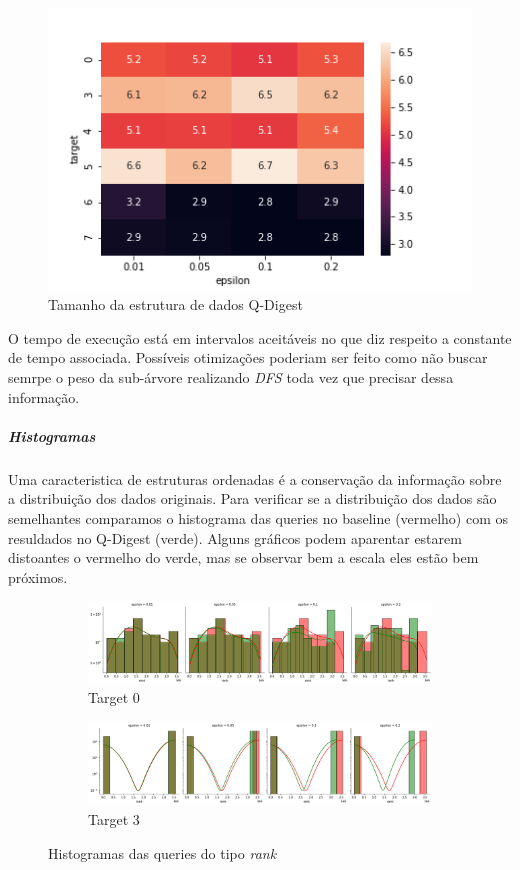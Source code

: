 \documentclass[11pt]{article}
\begin{document}
\begin{figure}[H]
  \centering
  \includegraphics[scale=0.5]{../../img/qdigest-heatmap_TEMPO.png}
  \caption{Tamanho da estrutura de dados Q-Digest}
\end{figure}
O tempo de execução está em intervalos aceitáveis no que diz respeito a constante de tempo associada. Possíveis otimizações poderiam ser feito como não buscar semrpe o peso da sub-árvore realizando \textit{DFS} toda vez que precisar dessa informação.

\subparagraph{Histogramas}

Uma caracteristica de estruturas ordenadas é a conservação da informação sobre a distribuição dos dados originais. Para verificar se a distribuição dos dados são semelhantes comparamos o histograma das queries no baseline (vermelho) com os resuldados no Q-Digest (verde).
Alguns gráficos podem aparentar estarem distoantes o vermelho do verde, mas se observar bem a escala eles estão bem próximos.
\begin{figure}[H]
  \begin{subfigure}{.5\textwidth}
    \centering
    \includegraphics[width=.9\linewidth]{../../img/qdigest-histograma_distrib_RANK_t_0.png}
    \caption{Target 0}
    \label{fig:sub-first}
  \end{subfigure}
  \begin{subfigure}{.5\textwidth}
    \centering
    \includegraphics[width=.9\linewidth]{../../img/qdigest-histograma_distrib_RANK_t_3.png}
    \caption{Target 3}
  \end{subfigure}
  \caption{Histogramas das queries do tipo \emph{rank}}
  \end{figure}
\end{document}
